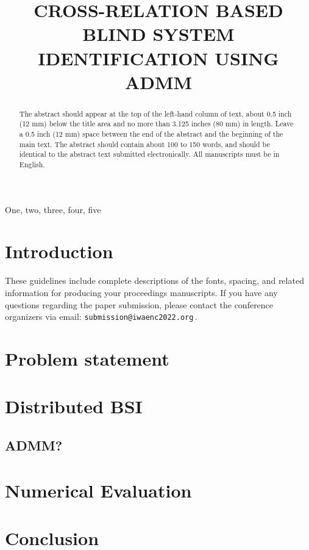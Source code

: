 \documentclass{article}
\title{CROSS-RELATION BASED BLIND SYSTEM IDENTIFICATION USING ADMM}
\begin{document}
%
\maketitle
%
\begin{abstract}
The abstract should appear at the top of the left-hand column of text, about 0.5 inch (12 mm) below the title area and no more than 3.125 inches (80 mm) in length.
Leave a 0.5 inch (12 mm) space between the end of the abstract and the beginning of the main text.
The abstract should contain about 100 to 150 words, and should be identical to the abstract text submitted electronically.
All manuscripts must be in English.
\end{abstract}
%
\begin{keywords}
One, two, three, four, five
\end{keywords}
%
\section{Introduction}
\label{sec:intro}

These guidelines include complete descriptions of the fonts, spacing, and related information for producing your proceedings manuscripts.
If you have any questions regarding the paper submission, please contact the conference organizers via email: \texttt{submission@iwaenc2022.org}\,.

\section{Problem statement}
\label{sec:problem_statement}


\section{Distributed BSI}
\label{sec:admm_bsi}

\subsection{ADMM?}
\label{ssec:admm}

\section{Numerical Evaluation}
\label{sec:num_eval}



\section{Conclusion}
\label{sec:conclusion}
\end{document}
